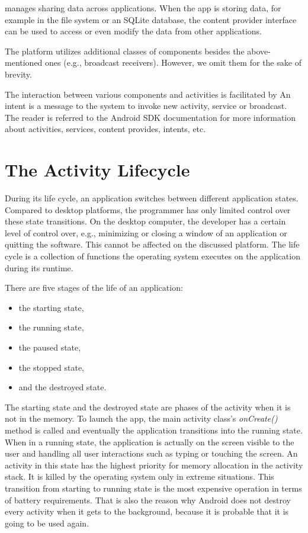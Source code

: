  manages sharing data across applications.
When the app is storing data, for example in the file system or an SQLite database, the content provider interface can be used to access or even modify the data from other applications. 

The platform utilizes additional classes of components besides the above-mentioned ones (e.g., broadcast receivers). 
However, we omit them for the sake of brevity. 

The interaction between various components and activities is facilitated by  
An intent is a message to the system to invoke new activity, service or broadcast.
The reader is referred to the Android SDK documentation for more information about activities, services, content provides, intents, etc. 

\section{The Activity Lifecycle}
\label{sec:lifecycle}

During its life cycle, an application switches between different application states.
Compared to desktop platforms, the programmer has only limited control over these state transitions.
On the desktop computer, the developer has a certain level of control over, e.g., minimizing or closing a window of an application or quitting the software. 
This cannot be affected on the discussed platform. 
The life cycle is a collection of functions the operating system executes on the application during its runtime. 

There are five stages of the life of an application:
\begin{itemize}
\item the starting state,
\item the running state,
\item the paused state,
\item the stopped state,
\item and the destroyed state.
\end{itemize}

The starting state and the destroyed state are phases of the activity when it is not in the memory.
To launch the app, the main activity class's \emph{onCreate()} method is called and eventually the application transitions into the running state. %
When in a running state, the application is actually on the screen visible to the user and handling all user interactions such as typing or touching the screen. 
An activity in this state has the highest priority for memory allocation in the activity stack.
It is killed by the operating system only in extreme situations.
This transition from starting to running state is the most expensive operation in terms of battery requirements.
That is also the reason why Android does not destroy every activity when it gets to the background, 
because it is probable that it is going to be used again. 

